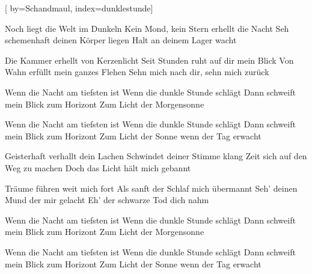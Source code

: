 
[%
    by={Schandmaul},
    index={dunklestunde}]


    \label{dunklestunde}

    \beginverse
        Noch liegt die Welt im Dunkeln
        Kein Mond, kein Stern erhellt die Nacht
        Seh schemenhaft deinen Körper liegen
        Halt an deinem Lager wacht

        Die Kammer erhellt von Kerzenlicht
        Seit Stunden ruht auf dir mein Blick
        Von Wahn erfüllt mein ganzes Flehen
        Sehn mich nach dir, sehn mich zurück
    \endverse

    \beginchorus
        Wenn die Nacht am tiefsten ist
        Wenn die dunkle Stunde schlägt
        Dann schweift mein Blick zum Horizont
        Zum Licht der Morgensonne

        Wenn die Nacht am tiefsten ist
        Wenn die dunkle Stunde schlägt
        Dann schweift mein Blick zum Horizont
        Zum Licht der Sonne wenn der Tag erwacht
    \endchorus

    \beginverse
        Geisterhaft verhallt dein Lachen
        Schwindet deiner Stimme klang
        Zeit sich auf den Weg zu machen
        Doch das Licht hält mich gebannt

        Träume führen weit mich fort
        Als sanft der Schlaf mich übermannt
        Seh' deinen Mund der mir gelacht
        Eh' der schwarze Tod dich nahm
    \endverse

    \beginchorus
        Wenn die Nacht am tiefsten ist
        Wenn die dunkle Stunde schlägt
        Dann schweift mein Blick zum Horizont
        Zum Licht der Morgensonne

        Wenn die Nacht am tiefsten ist
        Wenn die dunkle Stunde schlägt
        Dann schweift mein Blick zum Horizont
        Zum Licht der Sonne wenn der Tag erwacht
    \endchorus
\endsong
